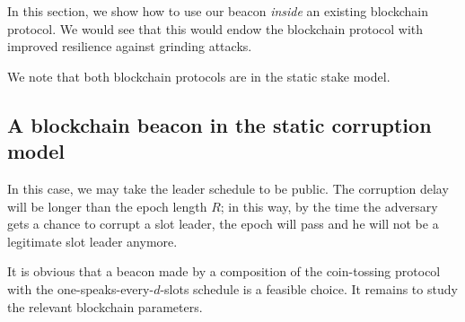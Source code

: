 
In this section, we show how to use our beacon \emph{inside} an existing blockchain protocol. 
We would see that this would endow the blockchain protocol with improved resilience against 
grinding attacks.

We note that both blockchain protocols are in the static stake model.


\subsection{A blockchain beacon in the static corruption model}
In this case, we may take the leader schedule to be public. 
The corruption delay will be longer than the epoch length $R$; 
in this way, by the time the adversary 
gets a chance to corrupt a slot leader, 
the epoch will pass and he will not be a legitimate slot leader anymore. 

It is obvious that a beacon made by a composition of the coin-tossing protocol 
with the one-speaks-every-$d$-slots schedule is a feasible choice. 
It remains to study the relevant blockchain parameters.

